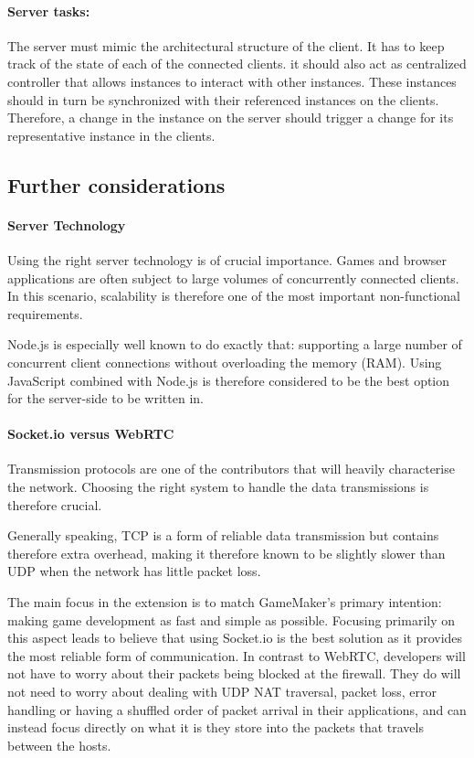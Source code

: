 \documentclass[bsc,frontabs,twoside,singlespacing,parskip,deptreport]{infthesis}     %
\begin{document}
\paragraph*{Server tasks:}
The server must mimic the architectural structure of the client. It has to keep track of the state of each of the connected clients. it should also act as centralized controller that allows instances to interact with other instances. These instances should in turn be synchronized with their referenced instances on the clients. Therefore, a change in the instance on the server should trigger a change for its representative instance in the clients.


\subsection{Further considerations}
\paragraph*{Server Technology}
Using the right server technology is of crucial importance. Games and browser applications are often subject to large volumes of concurrently connected clients. In this scenario, scalability is therefore one of the most important non-functional requirements. 

Node.js is especially well known to do exactly that: supporting a large number of concurrent client connections without overloading the memory (RAM). Using JavaScript combined with Node.js is therefore considered to be the best option for the server-side to be written in.

\paragraph*{Socket.io versus WebRTC}
Transmission protocols are one of the contributors that will heavily characterise the network. Choosing the right system to handle the data transmissions is therefore crucial. 
 
Generally speaking, TCP is a form of reliable data transmission but contains therefore extra overhead, making it therefore known to be slightly slower than UDP when the network has little packet loss.

The main focus in the extension is to match GameMaker's primary intention: making game development as fast and simple as possible. Focusing primarily on this aspect leads to believe that using Socket.io is the best solution as it provides the most reliable form of communication. In contrast to WebRTC, developers will not have to worry about their packets being blocked at the firewall. They do will not need to worry about dealing with UDP NAT traversal, packet loss, error handling or having a shuffled order of packet arrival in their applications, and can instead focus directly on what it is they store into the packets that travels between the hosts.
\end{document}
